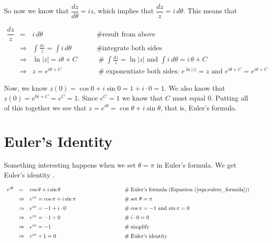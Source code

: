 \documentclass{article}
\theoremstyle{definition}
\begin{document}
\bigskip
\noindent
So now we know that $\dfrac{dz}{d\theta} = iz$, which implies
that $\dfrac{dz}{z} = i \, d\theta$. This means that 

\bigskip
\begin{equation*}
\begin{array}{lllll}
\dfrac{dz}{z} 
&=& {\displaystyle  i \, d\theta}
                &\qquad \mathrel{\#} \text{result from above} \\
[12pt]
&\Rightarrow& {\displaystyle \int \frac{dz}{z} =  \int i \,
d\theta}
                &\qquad \mathrel{\#} \text{integrate both sides} \\
[12pt]
&\Rightarrow&  {\displaystyle \ln{|z|} = i \theta + C}
                &\qquad \mathrel{\#} \text{${\displaystyle \int
                \frac{dz}{z} =  \ln{|z|}}$ and ${\displaystyle
                \int i \: d\theta = {i \, \theta +C}}$} \\ 
[12pt]
&\Rightarrow&  {\displaystyle z = e^{i\theta +C}}
                &\qquad \mathrel{\#} \text{exponentiate both
                sides: $e^{\ln |z|} = z$ and $e^{i \theta +C} =
                e^{i \theta +C}$}
\end{array}
\end{equation*}

\bigskip
\noindent
Now, we know $z(0) = \cos 0 + i \sin 0 = 1 + i \cdot 0 =1$. We
also know that $z(0) = e^{0i +C} = e^{C} = 1$. Since $e^{C} = 1$
we know that $C$ must equal $0$. Putting all of this together we
see that $z = e^{i\theta}=\cos{\theta}+i\sin{\theta}$, that is,
Euler's formula.


\bigskip
\section{Euler's Identity}
Something interesting happens when we set $\theta = \pi$ in
Euler's formula. We get Euler's identity \cite{wiki:eulers_identity}.

\bigskip
\begin{equation*}
\begin{array}{lllll}
e^{i\theta}
&=& \cos \theta + i \sin \theta                         
	&\qquad \qquad \qquad \qquad  \mathrel{\#} \text{Euler's formula (Equation (\ref{eqn:eulers_formula}))} \\
[5pt]
&\Rightarrow&  e^{i\pi} = \cos \pi + i \sin \pi         
	&\qquad \qquad \qquad \qquad  \mathrel{\#} \text{set $\theta = \pi$} \\
[5pt]
&\Rightarrow&  e^{i\pi} = -1 + i \cdot 0                
	&\qquad \qquad \qquad \qquad  \mathrel{\#} \text{$\cos \pi = -1$ and $\sin \pi = 0$} \\
[5pt]
&\Rightarrow&  e^{i\pi} = -1 + 0                        
	&\qquad \qquad \qquad \qquad  \mathrel{\#} i \cdot 0 = 0 \\
[5pt]
&\Rightarrow&  e^{i\pi} = -1                            
	&\qquad \qquad \qquad \qquad  \mathrel{\#} \text{simplify} \\
[5pt]
&\Rightarrow&  e^{i\pi} +1 = 0                          
	&\qquad \qquad \qquad \qquad  \mathrel{\#} \text{Euler's identity} 
\end{array}
\end{equation*}
%
%
%
\bigskip
\end{document}
